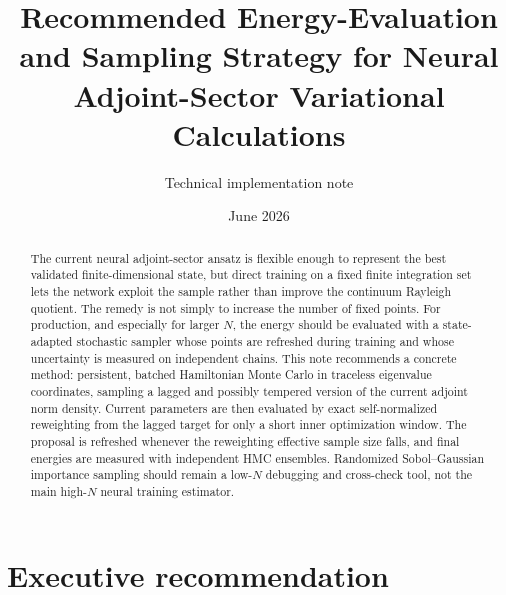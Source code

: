 \documentclass[11pt]{article}
\title{Recommended Energy-Evaluation and Sampling Strategy for Neural Adjoint-Sector Variational Calculations}
\author{Technical implementation note}
\date{June 2026}
\begin{document}
\maketitle

\begin{abstract}
The current neural adjoint-sector ansatz is flexible enough to represent the best validated finite-dimensional state, but direct training on a fixed finite integration set lets the network exploit the sample rather than improve the continuum Rayleigh quotient.  The remedy is not simply to increase the number of fixed points.  For production, and especially for larger $N$, the energy should be evaluated with a state-adapted stochastic sampler whose points are refreshed during training and whose uncertainty is measured on independent chains.  This note recommends a concrete method: persistent, batched Hamiltonian Monte Carlo in traceless eigenvalue coordinates, sampling a lagged and possibly tempered version of the current adjoint norm density.  Current parameters are then evaluated by exact self-normalized reweighting from the lagged target for only a short inner optimization window.  The proposal is refreshed whenever the reweighting effective sample size falls, and final energies are measured with independent HMC ensembles.  Randomized Sobol--Gaussian importance sampling should remain a low-$N$ debugging and cross-check tool, not the main high-$N$ neural training estimator.
\end{abstract}

\tableofcontents
\newpage

\section{Executive recommendation}
\end{document}
